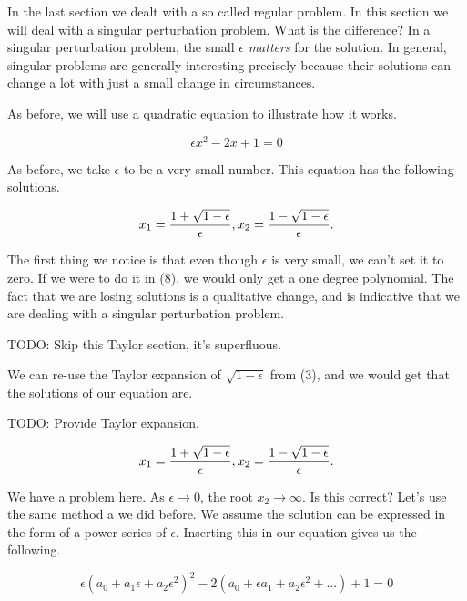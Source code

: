 \documentclass[12pt]{article}
\begin{document}
In the last section we dealt with a so called regular problem. In this section
we will deal with a singular perturbation problem. What is the difference? In a
singular perturbation problem, the small $\epsilon$ \textit{matters} for the
solution. In general, singular problems are generally interesting precisely
because their solutions can change a lot with just a small change in
circumstances.

As before, we will use a quadratic equation to illustrate how it works.

\begin{equation}
\epsilon x^2 - 2 x + 1 = 0
\end{equation}

As before, we take $\epsilon$ to be a very small number. This equation has the
following solutions.

\begin{equation}
x_1 = \frac{1 + \sqrt{1 - \epsilon}}{\epsilon}, \\
x_2 = \frac{1 - \sqrt{1 - \epsilon}}{\epsilon}.
\end{equation}

The first thing we notice is that even though $\epsilon$ is very small, we can't
set it to zero. If we were to do it in (8), we would only get a one degree
polynomial. The fact that we are losing solutions is a qualitative change, and
is indicative that we are dealing with a singular perturbation problem.

TODO: Skip this Taylor section, it's superfluous.

We can re-use the Taylor expansion of $\sqrt{1 - \epsilon}$ from (3), and we
would get that the solutions of our equation are.

TODO: Provide Taylor expansion.

\begin{equation}
x_1 = \frac{1 + \sqrt{1 - \epsilon}}{\epsilon}, \\
x_2 = \frac{1 - \sqrt{1 - \epsilon}}{\epsilon}.
\end{equation}

We have a problem here. As $\epsilon \to 0$, the root $x_2 \to \infty$. Is this
correct? Let's use the same method a we did before. We assume the solution can
be expressed in the form of a power series of $\epsilon$. Inserting this in our
equation gives us the following.

\begin{equation}
\epsilon (a_0 + a_1 \epsilon + a_2 \epsilon^2)^2 - 2(a_0 + \epsilon a_1 +
a_2 \epsilon^2 + ...) + 1 = 0
\end{equation}
\end{document}

